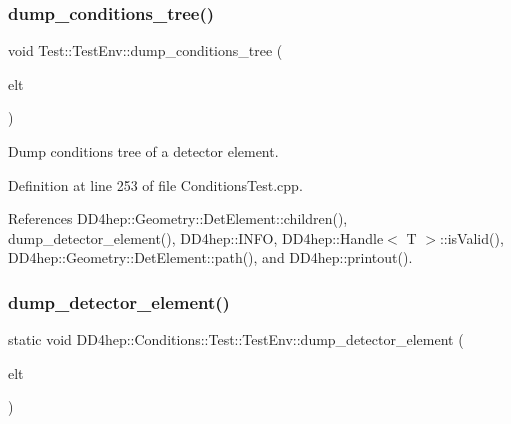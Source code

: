 \subsubsection{\texorpdfstring{dump\+\_\+conditions\+\_\+tree()}{dump\_conditions\_tree()}\hspace{0.1cm}{\footnotesize\ttfamily [2/2]}}
{\footnotesize\ttfamily void Test\+::\+Test\+Env\+::dump\+\_\+conditions\+\_\+tree (\begin{DoxyParamCaption}\item[{\hyperlink{class_d_d4hep_1_1_geometry_1_1_det_element}{Det\+Element}}]{elt }\end{DoxyParamCaption})\hspace{0.3cm}{\ttfamily [static]}}



Dump conditions tree of a detector element. 



Definition at line 253 of file Conditions\+Test.\+cpp.



References D\+D4hep\+::\+Geometry\+::\+Det\+Element\+::children(), dump\+\_\+detector\+\_\+element(), D\+D4hep\+::\+I\+N\+FO, D\+D4hep\+::\+Handle$<$ T $>$\+::is\+Valid(), D\+D4hep\+::\+Geometry\+::\+Det\+Element\+::path(), and D\+D4hep\+::printout().

\hypertarget{struct_d_d4hep_1_1_conditions_1_1_test_1_1_test_env_aa21613eb3a5e779b69819c285344a2a7}{}\label{struct_d_d4hep_1_1_conditions_1_1_test_1_1_test_env_aa21613eb3a5e779b69819c285344a2a7} 
\subsubsection{\texorpdfstring{dump\+\_\+detector\+\_\+element()}{dump\_detector\_element()}\hspace{0.1cm}{\footnotesize\ttfamily [1/2]}}
{\footnotesize\ttfamily static void D\+D4hep\+::\+Conditions\+::\+Test\+::\+Test\+Env\+::dump\+\_\+detector\+\_\+element (\begin{DoxyParamCaption}\item[{\hyperlink{class_d_d4hep_1_1_geometry_1_1_det_element}{Det\+Element}}]{elt }\end{DoxyParamCaption})\hspace{0.3cm}{\ttfamily [static]}}

